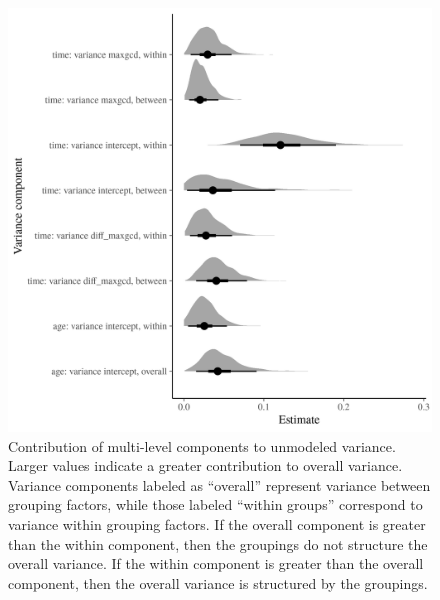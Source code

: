\documentclass[12pt,letterpaper]{article}
\begin{document}
\begin{figure}[ht]
  \centering
  \includegraphics[width=\textwidth,height=0.5\textheight,keepaspectratio=true]{figure/variance_components}
  \caption{Contribution of multi-level components to unmodeled variance. Larger values indicate a greater contribution to overall variance. Variance components labeled as ``overall'' represent variance between grouping factors, while those labeled  ``within groups'' correspond to variance within grouping factors. If the overall component is greater than the within component, then the groupings do not structure the overall variance. If the within component is greater than the overall component, then the overall variance is structured by the groupings.}
  \label{fig:variance_components}
\end{figure}
\end{document}

